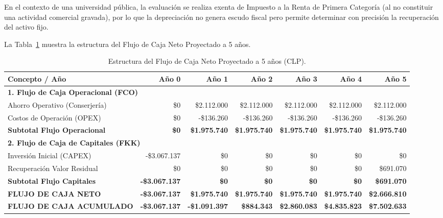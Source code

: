 En el contexto de una universidad pública, la evaluación se realiza exenta de Impuesto a la Renta de Primera Categoría (al no constituir una actividad comercial gravada), por lo que la depreciación no genera escudo fiscal pero permite determinar con precisión la recuperación del activo fijo.

La Tabla~\ref{tab:flujo_caja} muestra la estructura del Flujo de Caja Neto Proyectado a 5 años.

\begin{table}[H]
    \centering
    \footnotesize
    \setlength{\tabcolsep}{2pt}
    \caption{Estructura del Flujo de Caja Neto Proyectado a 5 años (CLP).}
    \begin{tabular}{|p{2.8cm}|r|r|r|r|r|r|}
        \hline
        \textbf{Concepto / Año} & \textbf{Año 0} & \textbf{Año 1} & \textbf{Año 2} & \textbf{Año 3} & \textbf{Año 4} & \textbf{Año 5} \\ \hline
        \multicolumn{7}{|l|}{\textbf{1. Flujo de Caja Operacional (FCO)}} \\ \hline
        Ahorro Operativo (Conserjería) & \$0 & \$2.112.000 & \$2.112.000 & \$2.112.000 & \$2.112.000 & \$2.112.000 \\ \hline
        Costos de Operación (OPEX) & \$0 & -\$136.260 & -\$136.260 & -\$136.260 & -\$136.260 & -\$136.260 \\ \hline
        \textbf{Subtotal Flujo Operacional} & \textbf{\$0} & \textbf{\$1.975.740} & \textbf{\$1.975.740} & \textbf{\$1.975.740} & \textbf{\$1.975.740} & \textbf{\$1.975.740} \\ \hline
        \multicolumn{7}{|l|}{\textbf{2. Flujo de Caja de Capitales (FKK)}} \\ \hline
        Inversión Inicial (CAPEX) & -\$3.067.137 & \$0 & \$0 & \$0 & \$0 & \$0 \\ \hline
        Recuperación Valor Residual & \$0 & \$0 & \$0 & \$0 & \$0 & \$691.070 \\ \hline
        \textbf{Subtotal Flujo Capitales} & \textbf{-\$3.067.137} & \textbf{\$0} & \textbf{\$0} & \textbf{\$0} & \textbf{\$0} & \textbf{\$691.070} \\ \hline
        \hline
        \textbf{FLUJO DE CAJA NETO} & \textbf{-\$3.067.137} & \textbf{\$1.975.740} & \textbf{\$1.975.740} & \textbf{\$1.975.740} & \textbf{\$1.975.740} & \textbf{\$2.666.810} \\ \hline
        \textbf{FLUJO DE CAJA ACUMULADO} & \textbf{-\$3.067.137} & \textbf{-\$1.091.397} & \textbf{\$884.343} & \textbf{\$2.860.083} & \textbf{\$4.835.823} & \textbf{\$7.502.633} \\ \hline
    \end{tabular}
    \label{tab:flujo_caja}
\end{table}

